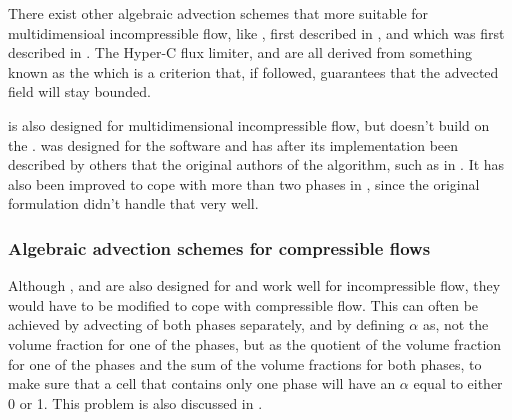 There exist other algebraic advection schemes that more suitable for multidimensioal incompressible flow, like \CICSAM, first described in \citep{Ubbink1999}, and \STACS which was first described in \citep{Darwish}. The Hyper-C flux limiter, \CICSAM and \STACS are all derived from something known as the \CBC which is a criterion that, if followed, guarantees that the advected field will stay bounded.

\MULES is also designed for multidimensional incompressible flow, but doesn't build on the \CBC. \MULES was designed for the  software  and has after its implementation been described by others that the original authors of the algorithm, such as in \citep{Berberovi2009}. It has also been improved to cope with more than two phases in \citep{Kissling2010}, since the original formulation didn't handle that very well.

\subsubsection{Algebraic advection schemes for compressible flows}

Although \CICSAM, \STACS and \MULES are also designed for and work well for incompressible flow, they would have to be modified to cope with compressible flow. This can often be achieved by advecting  of both phases separately, and by defining $\alpha$ as, not the volume fraction for one of the phases, but as the quotient of the volume fraction for one of the phases and the sum of the volume fractions for both phases, to make sure that a cell that contains only one phase will have an $\alpha$ equal to either 0 or 1. This problem is also discussed in \citep{Heyns2011}.





